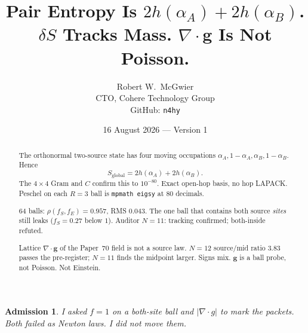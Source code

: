 \documentclass[11pt]{article}
\title{\textbf{Pair Entropy Is $2h(\alpha_A)+2h(\alpha_B)$.\\
$\delta S$ Tracks Mass. $\nabla\cdot\mathbf g$ Is Not Poisson.}}
\author{Robert W.\ McGwier\\
\small CTO, Cohere Technology Group\\
\small GitHub: \texttt{n4hy}}
\date{16 August 2026 --- Version 1}
\newtheorem*{admission}{Admission}
\begin{document}
\maketitle

\begin{abstract}
\noindent
The orthonormal two-source state has four moving
occupations $\alpha_A,1-\alpha_A,\alpha_B,1-\alpha_B$.
Hence
\[
S_{\mathrm{global}}=2h(\alpha_A)+2h(\alpha_B).
\]
The $4\times 4$ Gram and $C$ confirm this to
$10^{-80}$. Exact open-hop basis, no hop LAPACK.
Peschel on each $R=3$ ball is \texttt{mpmath eigsy}
at $80$ decimals.

$64$ balls: $\rho(f_S,f_E)=0.957$, RMS $0.043$.
The one ball that contains both source \emph{sites}
still leaks ($f_S=0.27$ below $1$). Auditor
$N=11$: tracking confirmed; both-inside refuted.

Lattice $\nabla\cdot\mathbf g$ of the Paper~70 field
is not a source law. $N=12$ source/mid ratio $3.83$
passes the pre-register; $N=11$ finds the midpoint
larger. Signs mix. $\mathbf g$ is a ball probe,
not Poisson. Not Einstein.
\end{abstract}

\begin{admission}
I asked $f=1$ on a both-site ball and
$\lvert\nabla\cdot g\rvert$ to mark the packets.
Both failed as Newton laws. I did not move them.
\end{admission}
\end{document}
